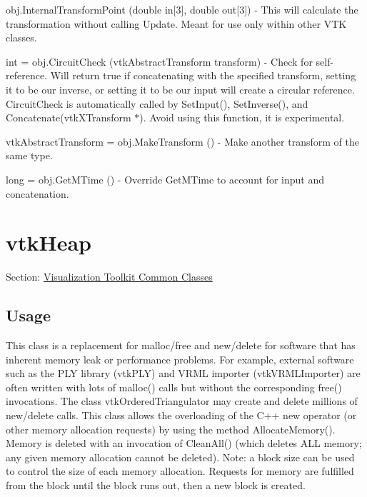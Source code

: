\begin{DoxyItemize}
\item {\ttfamily obj.\-Internal\-Transform\-Point (double in\mbox{[}3\mbox{]}, double out\mbox{[}3\mbox{]})} -\/ This will calculate the transformation without calling Update. Meant for use only within other V\-T\-K classes.  
\item {\ttfamily int = obj.\-Circuit\-Check (vtk\-Abstract\-Transform transform)} -\/ Check for self-\/reference. Will return true if concatenating with the specified transform, setting it to be our inverse, or setting it to be our input will create a circular reference. Circuit\-Check is automatically called by Set\-Input(), Set\-Inverse(), and Concatenate(vtk\-X\-Transform $\ast$). Avoid using this function, it is experimental.  
\item {\ttfamily vtk\-Abstract\-Transform = obj.\-Make\-Transform ()} -\/ Make another transform of the same type.  
\item {\ttfamily long = obj.\-Get\-M\-Time ()} -\/ Override Get\-M\-Time to account for input and concatenation.  
\end{DoxyItemize}\hypertarget{vtkcommon_vtkheap}{}\section{vtk\-Heap}\label{vtkcommon_vtkheap}
Section\-: \hyperlink{sec_vtkcommon}{Visualization Toolkit Common Classes} \hypertarget{vtkwidgets_vtkxyplotwidget_Usage}{}\subsection{Usage}\label{vtkwidgets_vtkxyplotwidget_Usage}
This class is a replacement for malloc/free and new/delete for software that has inherent memory leak or performance problems. For example, external software such as the P\-L\-Y library (vtk\-P\-L\-Y) and V\-R\-M\-L importer (vtk\-V\-R\-M\-L\-Importer) are often written with lots of malloc() calls but without the corresponding free() invocations. The class vtk\-Ordered\-Triangulator may create and delete millions of new/delete calls. This class allows the overloading of the C++ new operator (or other memory allocation requests) by using the method Allocate\-Memory(). Memory is deleted with an invocation of Clean\-All() (which deletes A\-L\-L memory; any given memory allocation cannot be deleted). Note\-: a block size can be used to control the size of each memory allocation. Requests for memory are fulfilled from the block until the block runs out, then a new block is created.

